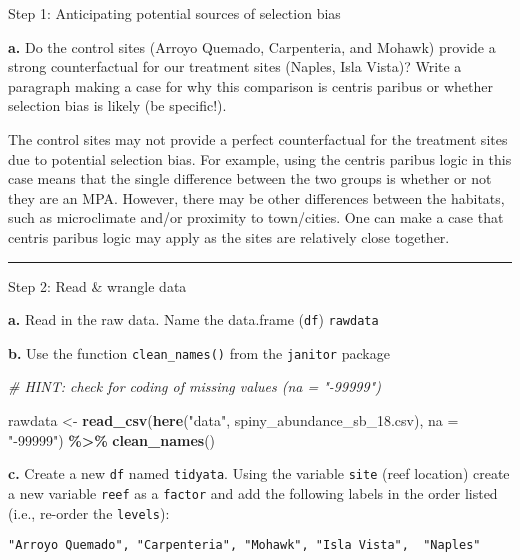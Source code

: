 \documentclass[
]{article}
\newenvironment{Shaded}{\begin{snugshade}}{\end{snugshade}}
\newcommand{\AttributeTok}[1]{\textcolor[rgb]{0.13,0.29,0.53}{#1}}
\newcommand{\CommentTok}[1]{\textcolor[rgb]{0.56,0.35,0.01}{\textit{#1}}}
\newcommand{\FunctionTok}[1]{\textcolor[rgb]{0.13,0.29,0.53}{\textbf{#1}}}
\newcommand{\NormalTok}[1]{#1}
\newcommand{\OtherTok}[1]{\textcolor[rgb]{0.56,0.35,0.01}{#1}}
\newcommand{\SpecialCharTok}[1]{\textcolor[rgb]{0.81,0.36,0.00}{\textbf{#1}}}
\newcommand{\StringTok}[1]{\textcolor[rgb]{0.31,0.60,0.02}{#1}}
\begin{document}
Step 1: Anticipating potential sources of selection bias

\textbf{a.} Do the control sites (Arroyo Quemado, Carpenteria, and
Mohawk) provide a strong counterfactual for our treatment sites (Naples,
Isla Vista)? Write a paragraph making a case for why this comparison is
centris paribus or whether selection bias is likely (be specific!).

The control sites may not provide a perfect counterfactual for the
treatment sites due to potential selection bias. For example, using the
centris paribus logic in this case means that the single difference
between the two groups is whether or not they are an MPA. However, there
may be other differences between the habitats, such as microclimate
and/or proximity to town/cities. One can make a case that centris
paribus logic may apply as the sites are relatively close together.

\begin{center}\rule{0.5\linewidth}{0.5pt}\end{center}

Step 2: Read \& wrangle data

\textbf{a.} Read in the raw data. Name the data.frame (\texttt{df})
\texttt{rawdata}

\textbf{b.} Use the function \texttt{clean\_names()} from the
\texttt{janitor} package

\begin{Shaded}
\begin{Highlighting}[]
\CommentTok{\# HINT: check for coding of missing values (\textasciigrave{}na = "{-}99999"\textasciigrave{})}

\NormalTok{rawdata }\OtherTok{\textless{}{-}} \FunctionTok{read\_csv}\NormalTok{(}\FunctionTok{here}\NormalTok{(}\StringTok{"data"}\NormalTok{, }\StringTok{\textquotesingle{}spiny\_abundance\_sb\_18.csv\textquotesingle{}}\NormalTok{), }\AttributeTok{na =} \StringTok{"{-}99999"}\NormalTok{) }\SpecialCharTok{\%\textgreater{}\%}
    \FunctionTok{clean\_names}\NormalTok{()}
\end{Highlighting}
\end{Shaded}

\textbf{c.} Create a new \texttt{df} named \texttt{tidyata}. Using the
variable \texttt{site} (reef location) create a new variable
\texttt{reef} as a \texttt{factor} and add the following labels in the
order listed (i.e., re-order the \texttt{levels}):

\begin{verbatim}
"Arroyo Quemado", "Carpenteria", "Mohawk", "Isla Vista",  "Naples"
\end{verbatim}
\end{document}

